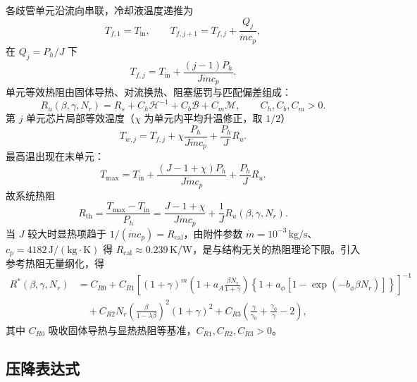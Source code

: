 \documentclass[12pt,a4paper]{ctexart}
\begin{document}
各歧管单元沿流向串联，冷却液温度递推为
\begin{equation}
    T_{f,1}=T_{\mathrm{in}},\qquad
    T_{f,j+1}=T_{f,j}+\frac{Q_j}{\dot m c_p},
\end{equation}
在 $Q_j=P_h/J$ 下
\begin{equation}
    T_{f,j}=T_{\mathrm{in}}+\frac{(j-1)P_h}{J\dot m c_p}.
\end{equation}
单元等效热阻由固体导热、对流换热、阻塞惩罚与匹配偏差组成：
\begin{equation}
    R_u(\beta,\gamma,N_r)
    =R_s+C_h\mathcal{H}^{-1}+C_b\mathcal{B}+C_m\mathcal{M},\qquad C_h,C_b,C_m>0.
\end{equation}
第 $j$ 单元芯片局部等效温度（$\chi$ 为单元内平均升温修正，取 $1/2$）
\begin{equation}
    T_{w,j}=T_{f,j}+\chi\frac{P_h}{J\dot m c_p}+\frac{P_h}{J}R_u .
\end{equation}
最高温出现在末单元：
\begin{equation}
    T_{\max}=T_{\mathrm{in}}+\frac{(J-1+\chi)P_h}{J\dot m c_p}+\frac{P_h}{J}R_u .
\end{equation}
故系统热阻
\begin{equation}
    R_{\mathrm{th}}=\frac{T_{\max}-T_{\mathrm{in}}}{P_h}
    =\frac{J-1+\chi}{J\dot m c_p}+\frac{1}{J}R_u(\beta,\gamma,N_r).
\end{equation}
当 $J$ 较大时显热项趋于 $1/(\dot m c_p)=R_{\mathrm{cal}}$，由附件参数 $\dot m=10^{-3}\,\mathrm{kg/s}$、$c_p=4182\,\mathrm{J/(kg\cdot K)}$ 得 $R_{\mathrm{cal}}\approx0.239\,\mathrm{K/W}$，是与结构无关的热阻理论下限。引入参考热阻无量纲化，得
\begin{equation}
\begin{aligned}
    R^*(\beta,\gamma,N_r)
    &=C_{R0}
    +C_{R1}\left[(1+\gamma)^m
    \left(1+a_A\frac{\beta N_r}{1+\gamma}\right)
    \left\{1+a_\phi\left[1-\exp(-b_\phi\beta N_r)\right]\right\}\right]^{-1}\\
    &\quad
    +C_{R2}N_r\left(\frac{\beta}{1-\lambda\beta}\right)^2(1+\gamma)^2
    +C_{R3}\left(\frac{\gamma}{\gamma_0}+\frac{\gamma_0}{\gamma}-2\right),
\end{aligned}
\label{eq:Rstar-final}
\end{equation}
其中 $C_{R0}$ 吸收固体导热与显热热阻等基准，$C_{R1},C_{R2},C_{R3}>0$。

\subsection{压降表达式}
\end{document}
